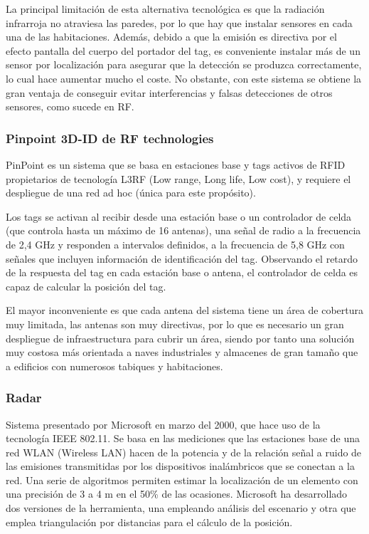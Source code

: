 La principal limitación de esta alternativa tecnológica es que la radiación infrarroja no atraviesa las paredes, por lo que hay que instalar sensores en cada una de las habitaciones. Además, debido a que la emisión es directiva por el efecto pantalla del cuerpo del portador del tag, es conveniente instalar más de un sensor por localización para asegurar que la detección se produzca correctamente, lo cual hace aumentar mucho el coste. No obstante, con este sistema se obtiene la gran ventaja de conseguir evitar interferencias y falsas detecciones de otros sensores, como sucede en RF. 

\subsubsection{Pinpoint 3D-ID de RF technologies}

PinPoint es un sistema que se basa en estaciones base y tags activos de RFID propietarios de tecnología L3RF (Low range, Long life, Low cost), y requiere el despliegue de una red ad hoc (única para este propósito). 

Los tags se activan al recibir desde una estación base o un controlador de celda (que controla hasta un máximo de 16 antenas), una señal de radio a la frecuencia de 2,4 GHz y responden a intervalos definidos, a la frecuencia de 5,8 GHz con señales que incluyen información de identificación del tag. Observando el retardo de la respuesta del tag en cada estación base o antena, el controlador de celda es capaz de calcular la posición del tag. 

El mayor inconveniente es que cada antena del sistema tiene un área de cobertura muy limitada, las antenas son muy directivas, por lo que es necesario un gran despliegue de infraestructura para cubrir un área, siendo por tanto una solución muy costosa más orientada a naves industriales y almacenes de gran tamaño que a edificios con numerosos tabiques y habitaciones. 

\subsubsection{Radar}

Sistema presentado por Microsoft en marzo del 2000, que hace uso de la tecnología IEEE 802.11. Se basa en las mediciones que las estaciones base de una red WLAN (Wireless LAN) hacen de la potencia y de la relación señal a ruido de las emisiones transmitidas por los dispositivos inalámbricos que se conectan a la red. Una serie de algoritmos permiten estimar la localización de un elemento con una precisión de 3 a 4 m en el 50\% de las ocasiones. Microsoft ha desarrollado dos versiones de la herramienta, una empleando análisis del escenario y otra que emplea triangulación por distancias para el cálculo de la posición. 


